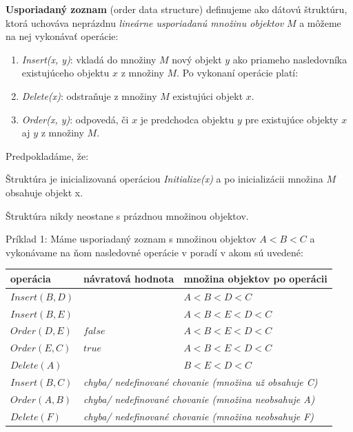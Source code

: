 \documentclass[
  digital,     %
  oneside,     %
  nosansbold,  %
  nocolorbold, %
  lof,         %
  lot,         %
]{fithesis4}
\begin{document}
\textbf{Usporiadaný zoznam} (order data structure) definujeme ako dátovú štruktúru, ktorá uchováva neprázdnu \textit{lineárne usporiadanú množinu objektov} $M$ a môžeme na nej vykonávať operácie:
\begin{enumerate}
    \item \textit{Insert(x, y)}: vkladá do množiny $M$ nový objekt $y$ ako priameho nasledovníka existujúceho objektu $x$ z množiny $M$. Po vykonaní operácie platí:

    \item \textit{Delete(x)}: odstraňuje z množiny $M$ existujúci objekt $x$.
    \item \textit{Order(x, y)}: odpovedá, či $x$ je predchodca objektu $y$ pre existujúce objekty $x$ aj $y$ z množiny $M$.
\end{enumerate}
Predpokladáme, že:
\begin{compactitem}
    \item Štruktúra je inicializovaná operáciou \textit{Initialize(x)} a po inicializácii množina $M$ obsahuje objekt x.
    \item Štruktúra nikdy neostane s prázdnou množinou objektov.\\
\end{compactitem}

Príklad 1:
Máme usporiadaný zoznam s množinou objektov $A < B < C$ a vykonávame na ňom nasledovné operácie v poradí v akom sú uvedené:\\
\begin{table}
\begin{tabularx}{\textwidth}{| l | l | l |}
    operácia & návratová hodnota & množina objektov po operácii \\
    \midrule
    $Insert(B, D)$ &  & $A < B < D < C$\\
    $Insert(B, E)$ &  & $A < B < E < D < C$\\
    $Order(D, E)$ & $false$ & $A < B < E < D < C$\\
    $Order(E, C)$ & $true$ & $A < B < E < D < C$\\
    $Delete(A)$ &  & $B < E < D < C$\\
    $Insert(B, C)$ & \multicolumn{2}{l|}{\textit{chyba/ nedefinované chovanie (množina už obsahuje C)}}\\
    $Order(A, B)$ & \multicolumn{2}{l|}{\textit{chyba/ nedefinované chovanie (množina neobsahuje A)}}\\
    $Delete(F)$ & \multicolumn{2}{l|}{\textit{chyba/ nedefinované chovanie (množina neobsahuje F)}}\\
  \end{tabularx}
\end{table}
\end{document}
